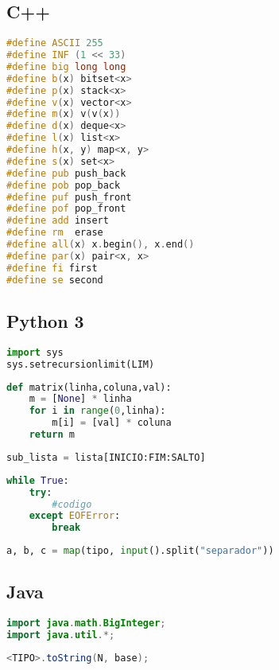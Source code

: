 \subsection*{C++}
\begin{lstlisting}[language=C++, title={Acelerar digitação}]
#define ASCII 255
#define INF (1 << 33)
#define big long long
#define b(x) bitset<x>
#define p(x) stack<x>
#define v(x) vector<x>
#define m(x) v(v(x))
#define d(x) deque<x>
#define l(x) list<x>
#define h(x, y) map<x, y>
#define s(x) set<x>
#define pub push_back
#define pob pop_back
#define puf push_front
#define pof pop_front
#define add insert
#define rm  erase
#define all(x) x.begin(), x.end()
#define par(x) pair<x, x>
#define fi first
#define se second
\end{lstlisting}

\newpage

\subsection*{Python 3}
\begin{lstlisting}[language=Python, title={Tamanho da Pilha de Recursão}]
import sys
sys.setrecursionlimit(LIM)
\end{lstlisting}

\begin{lstlisting}[language=Python, title={Matriz}]
def matrix(linha,coluna,val):
	m = [None] * linha
	for i in range(0,linha):
		m[i] = [val] * coluna
	return m
\end{lstlisting}

\begin{lstlisting}[language=Python, title={Cortar Lista ou String }] 
sub_lista = lista[INICIO:FIM:SALTO]
\end{lstlisting}

\begin{lstlisting}[language=Python, title={Ler Até EOF}]
while True:
	try:
    	#codigo
    except EOFError:
    	break
\end{lstlisting}
\begin{lstlisting}[language=Python, title={Múltiplas Entradas na Mesma Linha}]
a, b, c = map(tipo, input().split("separador"))
\end{lstlisting}
\subsection*{Java}
\begin{lstlisting}[language=Java, title={Bibliotecas importantes}]
import java.math.BigInteger;
import java.util.*;
\end{lstlisting}

\begin{lstlisting}[language=Java, title={Conversão de Base}]
<TIPO>.toString(N, base);
\end{lstlisting}